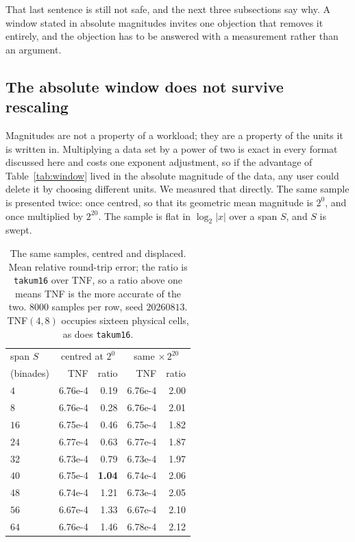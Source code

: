\documentclass[11pt]{article}
\theoremstyle{definition}
\begin{document}
That last sentence is still not safe, and the next three subsections say why. A
window stated in absolute magnitudes invites one objection that removes it
entirely, and the objection has to be answered with a measurement rather than an
argument.

\subsection{The absolute window does not survive rescaling}
\label{sec:centring}

Magnitudes are not a property of a workload; they are a property of the units it
is written in. Multiplying a data set by a power of two is exact in every format
discussed here and costs one exponent adjustment, so if the advantage of
Table~\ref{tab:window} lived in the absolute magnitude of the data, any user could
delete it by choosing different units. We measured that directly. The same sample
is presented twice: once centred, so that its geometric mean magnitude is $2^0$,
and once multiplied by $2^{20}$. The sample is flat in $\log_2|x|$ over a span
$S$, and $S$ is swept.

\begin{table}[htbp]\centering
\caption{The same samples, centred and displaced. Mean relative round-trip error;
the ratio is \texttt{takum16} over TNF, so a ratio above one means TNF is the more
accurate of the two. $8000$ samples per row, seed $20260813$. TNF$(4,8)$ occupies
sixteen physical cells, as does \texttt{takum16}.}
\label{tab:centring}
\begin{tabular}{lrrrr}
\hline
span $S$ & \multicolumn{2}{c}{centred at $2^0$} & \multicolumn{2}{c}{same $\times\,2^{20}$} \\
(binades) & TNF & ratio & TNF & ratio \\
\hline
$4$ & 6.76e-4 & 0.19 & 6.76e-4 & 2.00 \\
$8$ & 6.76e-4 & 0.28 & 6.76e-4 & 2.01 \\
$16$ & 6.75e-4 & 0.46 & 6.75e-4 & 1.82 \\
$24$ & 6.77e-4 & 0.63 & 6.77e-4 & 1.87 \\
$32$ & 6.73e-4 & 0.79 & 6.73e-4 & 1.97 \\
$40$ & 6.75e-4 & \textbf{1.04} & 6.74e-4 & 2.06 \\
$48$ & 6.74e-4 & 1.21 & 6.73e-4 & 2.05 \\
$56$ & 6.67e-4 & 1.33 & 6.67e-4 & 2.10 \\
$64$ & 6.76e-4 & 1.46 & 6.78e-4 & 2.12 \\
\hline
\end{tabular}
\end{table}
\end{document}
